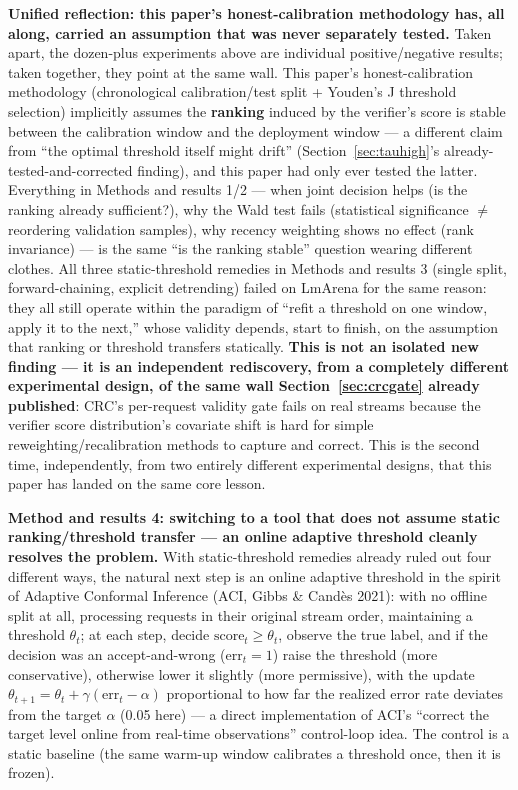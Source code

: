 \documentclass[11pt]{article}
\begin{document}
\textbf{Unified reflection: this paper's honest-calibration methodology has, all along, carried an assumption that was never separately tested.} Taken apart, the dozen-plus experiments above are individual positive/negative results; taken together, they point at the same wall. This paper's honest-calibration methodology (chronological calibration/test split + Youden's J threshold selection) implicitly assumes the \textbf{ranking} induced by the verifier's score is stable between the calibration window and the deployment window --- a different claim from ``the optimal threshold itself might drift'' (Section~\ref{sec:tauhigh}'s already-tested-and-corrected finding), and this paper had only ever tested the latter. Everything in Methods and results 1/2 --- when joint decision helps (is the ranking already sufficient?), why the Wald test fails (statistical significance $\neq$ reordering validation samples), why recency weighting shows no effect (rank invariance) --- is the same ``is the ranking stable'' question wearing different clothes. All three static-threshold remedies in Methods and results 3 (single split, forward-chaining, explicit detrending) failed on LmArena for the same reason: they all still operate within the paradigm of ``refit a threshold on one window, apply it to the next,'' whose validity depends, start to finish, on the assumption that ranking or threshold transfers statically. \textbf{This is not an isolated new finding --- it is an independent rediscovery, from a completely different experimental design, of the same wall Section~\ref{sec:crcgate} already published}: CRC's per-request validity gate fails on real streams because the verifier score distribution's covariate shift is hard for simple reweighting/recalibration methods to capture and correct. This is the second time, independently, from two entirely different experimental designs, that this paper has landed on the same core lesson.

\textbf{Method and results 4: switching to a tool that does not assume static ranking/threshold transfer --- an online adaptive threshold cleanly resolves the problem.} With static-threshold remedies already ruled out four different ways, the natural next step is an online adaptive threshold in the spirit of Adaptive Conformal Inference (ACI, Gibbs \& Cand\`es 2021): with no offline split at all, processing requests in their original stream order, maintaining a threshold $\theta_t$; at each step, decide $\text{score}_t \ge \theta_t$, observe the true label, and if the decision was an accept-and-wrong ($\text{err}_t=1$) raise the threshold (more conservative), otherwise lower it slightly (more permissive), with the update $\theta_{t+1} = \theta_t + \gamma(\text{err}_t - \alpha)$ proportional to how far the realized error rate deviates from the target $\alpha$ (0.05 here) --- a direct implementation of ACI's ``correct the target level online from real-time observations'' control-loop idea. The control is a static baseline (the same warm-up window calibrates a threshold once, then it is frozen).
\end{document}
